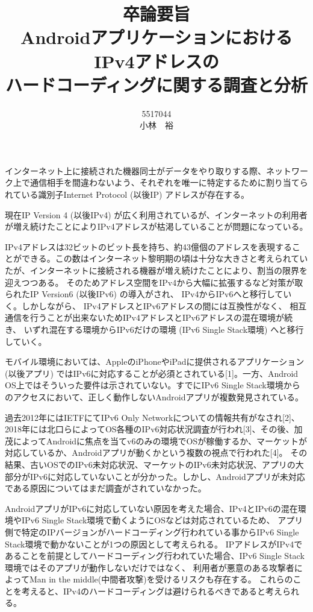 \documentclass[twocolumn, 10pt, a4paper]{jarticle}
\title{\vspace{-3cm}
{\large 卒論要旨}\\
{\bf
AndroidアプリケーションにおけるIPv4アドレスの\\ハードコーディングに関する調査と分析
}
}
\author{
5517044 \\		%
小林　裕		%
}
\date{}
\begin{document}
\maketitle
\thispagestyle{empty}

インターネット上に接続された機器同士がデータをやり取りする際、ネットワーク上で通信相手を間違わないよう、それぞれを唯一に特定するために割り当てられている識別子Internet Protocol (以後IP) アドレスが存在する。

現在IP Version 4 (以後IPv4) が広く利用されているが、インターネットの利用者が増え続けたことによりIPv4アドレスが枯渇していることが問題になっている。

IPv4アドレスは32ビットのビット長を持ち、約43億個のアドレスを表現することができる。この数はインターネット黎明期の頃は十分な大きさと考えられていたが、インターネットに接続される機器が増え続けたことにより、割当の限界を迎えつつある。
そのためアドレス空間をIPv4から大幅に拡張するなど対策が取られたIP Version6 (以後IPv6) の導入がされ、
IPv4からIPv6へと移行していく。しかしながら、
IPv4アドレスとIPv6アドレスの間には互換性がなく、
相互通信を行うことが出来ないためIPv4アドレスとIPv6アドレスの混在環境が続き、
いずれ混在する環境からIPv6だけの環境 (IPv6 Single Stack環境) へと移行していく。

モバイル環境においては、AppleのiPhoneやiPadに提供されるアプリケーション (以後アプリ) ではIPv6に対応することが必須とされている[1]。一方、Android OS上ではそういった要件は示されていない。すでにIPv6 Single Stack環境からのアクセスにおいて、正しく動作しないAndroidアプリが複数発見されている。

過去2012年にはIETFにてIPv6 Only Networkについての情報共有がなされ[2]、2018年には北口らによってOS各種のIPv6対応状況調査が行われ[3]、その後、加茂によってAndroidに焦点を当てv6のみの環境でOSが稼働するか、マーケットが対応しているか、Androidアプリが動くかという複数の視点で行われた[4]。
その結果、古いOSでのIPv6未対応状況、マーケットのIPv6未対応状況、アプリの大部分がIPv6に対応していないことが分かった。しかし、Androidアプリが未対応である原因についてはまだ調査がされていなかった。

AndroidアプリがIPv6に対応していない原因を考えた場合、IPv4とIPv6の混在環境やIPv6 Single Stack環境で動くようにOSなどは対応されているため、
アプリ側で特定のIPバージョンがハードコーディング行われている事からIPv6 Single Stack環境で動かないことが1つの原因として考えられる。
IPアドレスがIPv4であることを前提としてハードコーディング行われていた場合、IPv6 Single Stack環境ではそのアプリが動作しないだけではなく、
利用者が悪意のある攻撃者によってMan in the middle(中間者攻撃)を受けるリスクも存在する。
これらのことを考えると、IPv4のハードコーディングは避けられるべきであると考えられる。
\end{document}
